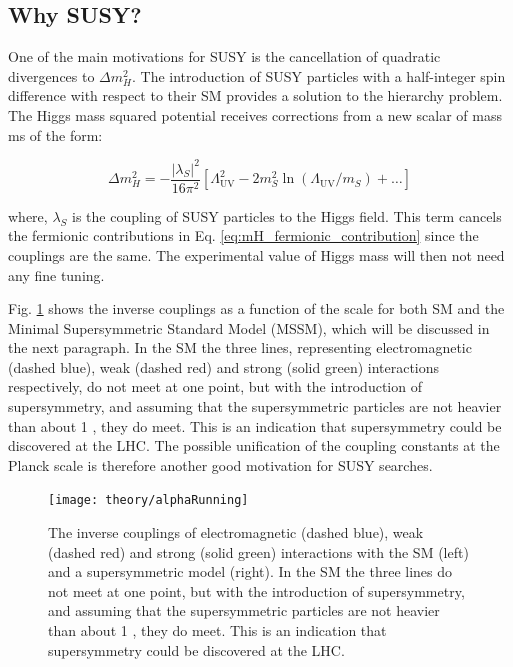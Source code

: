 		

		\subsection{Why SUSY?}

			One of the main motivations for SUSY is the cancellation of quadratic divergences to $\Delta m_H^2$. 
			The introduction of SUSY particles with a half-integer spin difference with respect to their SM provides a solution to the hierarchy problem. The Higgs mass squared potential receives corrections from a new scalar of mass ms of the form:

			\begin{equation}
			\label{eq:mH_scalar_contribution}
			\Delta m_H^2 = - \frac{\left | \lambda_S \right |^2}{16 \pi ^2} \left [  \Lambda_{\mathrm{UV}}^2 - 2m_S^2 \ln \left (\Lambda_{\mathrm{UV}} / m_S \right) + \dots \right ]
			\end{equation}

			\noindent where, $\lambda_S$ is the coupling of SUSY particles to the Higgs field. This term cancels the fermionic contributions in Eq. \ref{eq:mH_fermionic_contribution} since the couplings are the same. The experimental value of Higgs mass will then not need any fine tuning.

			Fig. \ref{fig:alphaRunning} shows the inverse couplings as a function of the scale for both SM and the Minimal Supersymmetric Standard Model (MSSM), which will be discussed in the next paragraph. In the SM the three lines, representing electromagnetic (dashed blue), weak (dashed red) and strong (solid green) interactions respectively, do not meet at one point, but with the introduction of supersymmetry, and assuming that the supersymmetric particles are not heavier than about 1 \TeV, they do meet. This is an indication that supersymmetry could be discovered at the LHC. The possible unification of the coupling constants at the Planck scale is therefore another good motivation for SUSY searches. 

			\begin{figure}[!htb]
				\centering
				\texttt{[image: theory/alphaRunning]}
				\caption{\label{fig:alphaRunning} The inverse couplings of electromagnetic (dashed blue), weak (dashed red) and strong (solid green) interactions with the SM (left) and a supersymmetric model (right). In the SM the three lines do not meet at one point, but with the introduction of supersymmetry, and assuming that the supersymmetric particles are not heavier than about 1 \TeV, they do meet. This is an indication that supersymmetry could be discovered at the LHC.}
			\end{figure}



